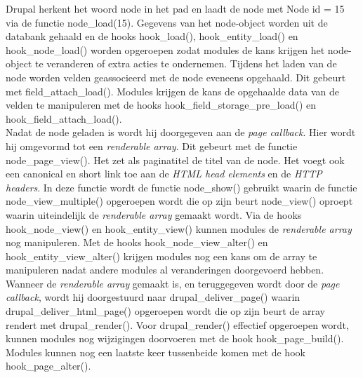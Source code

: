 Drupal herkent het woord node in het pad en laadt de node met Node id = 15 via de functie node\_load(15). Gegevens van het node-object worden uit de databank gehaald en de hooks hook\_load(), hook\_entity\_load() en hook\_node\_load() worden opgeroepen zodat modules de kans krijgen het node-object te veranderen of extra acties te ondernemen. Tijdens het laden van de node worden velden geassocieerd met de node eveneens opgehaald. Dit gebeurt met field\_attach\_load(). Modules krijgen de kans de opgehaalde data van de velden te manipuleren met de hooks hook\_field\_storage\_pre\_load() en hook\_field\_attach\_load().\\

Nadat de node geladen is wordt hij doorgegeven aan de \textit{page callback}. Hier wordt hij omgevormd tot een \textit{renderable array}. Dit gebeurt met de functie node\_page\_view(). Het zet als paginatitel de titel van de node. Het voegt ook een canonical en short link toe aan de \textit{HTML head elements} en de \textit{HTTP headers}. In deze functie wordt de functie node\_show() gebruikt waarin de functie node\_view\_multiple() opgeroepen wordt die op zijn beurt node\_view() oproept waarin uiteindelijk de \textit{renderable array} gemaakt wordt. Via de hooks hook\_node\_view() en hook\_entity\_view() kunnen modules de \textit{renderable array} nog manipuleren. Met de hooks hook\_node\_view\_alter() en hook\_entity\_view\_alter() krijgen modules nog een kans om de array te manipuleren nadat andere modules al veranderingen doorgevoerd hebben.\\

Wanneer de \textit{renderable array} gemaakt is, en teruggegeven wordt door de \textit{page callback}, wordt hij doorgestuurd naar drupal\_deliver\_page() waarin drupal\_deliver\_html\_page() opgeroepen wordt die op zijn beurt de array rendert met drupal\_render(). Voor drupal\_render() effectief opgeroepen wordt, kunnen modules nog wijzigingen doorvoeren met de hook hook\_page\_build(). Modules kunnen nog een laatste keer tussenbeide komen met de hook hook\_page\_alter().

